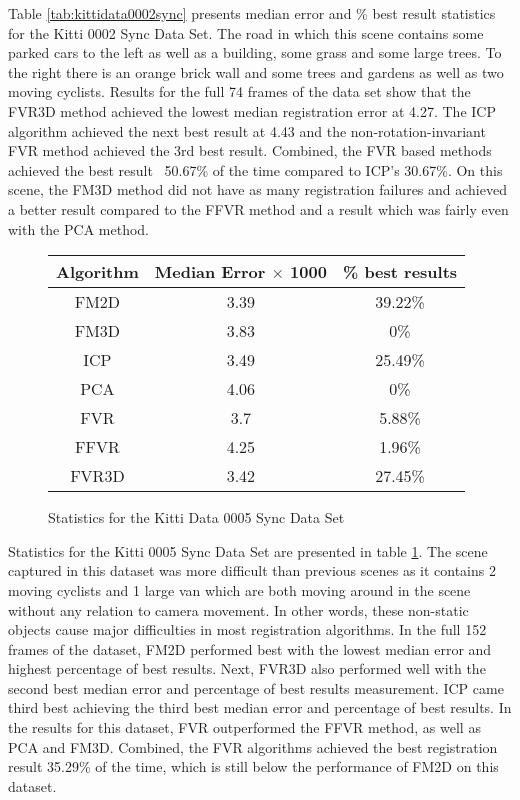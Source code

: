 Table \ref{tab:kittidata0002sync} presents median error and \% best result statistics for the Kitti 0002 Sync Data Set. The road in which this scene contains some parked cars to the left as well as a building, some grass and some large trees. To the right there is an orange brick wall and some trees and gardens as well as two moving cyclists. Results for the full 74 frames of the data set show that the FVR3D method achieved the lowest median registration error at 4.27. The ICP algorithm achieved the next best result at 4.43 and the non-rotation-invariant FVR method achieved the 3rd best result. Combined, the FVR based methods achieved the best result ~50.67\% of the time compared to ICP's 30.67\%. On this scene, the FM3D method did not have as many registration failures and achieved a better result compared to the FFVR method and a result which was fairly even with the PCA method. \\ 




\begin{figure}
\centering
\begin{tabular}{ccc}
\hline
\textbf{Algorithm} & \textbf{Median Error $\times$ 1000} & \textbf{\% best results}\\ \hline
FM2D	& 3.39 & 39.22\%\\
FM3D	& 3.83 & 0\%\\
ICP	& 3.49 & 25.49\%\\
PCA	& 4.06 & 0\%\\
FVR	& 3.7 & 5.88\%\\
FFVR	& 4.25 & 1.96\%\\
FVR3D	& 3.42 & 27.45\%\\
\end{tabular}
\caption{Statistics for the Kitti Data 0005 Sync Data Set}
\label{tab:kittidata0005sync}
\end{figure} 

Statistics for the Kitti 0005 Sync Data Set are presented in table \ref{tab:kittidata0005sync}. The scene captured in this dataset was more difficult than previous scenes as it contains 2 moving cyclists and 1 large van which are both moving around in the scene without any relation to camera movement. In other words, these non-static objects cause major difficulties in most registration algorithms. In the full 152 frames of the dataset, FM2D performed best with the lowest median error and highest percentage of best results. Next, FVR3D also performed well with the second best median error and percentage of best results measurement. ICP came third best achieving the third best median error and percentage of best results. In the results for this dataset, FVR outperformed the FFVR method, as well as PCA and FM3D. Combined, the FVR algorithms achieved the best registration result 35.29\% of the time, which is still below the performance of FM2D on this dataset. \\

